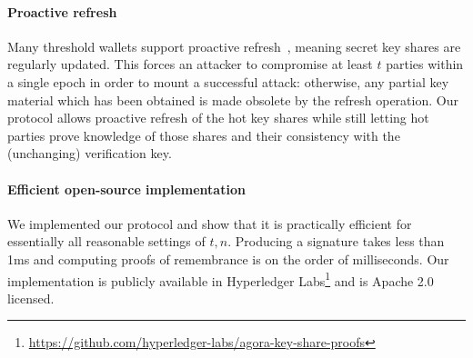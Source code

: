 \paragraph{Proactive refresh}
Many threshold wallets support proactive refresh~\cite{SP:KMOS21}, meaning secret key shares are regularly updated. This forces an attacker to compromise at least $t$ parties within a single epoch in order to mount a successful attack: otherwise, any partial key material which has been obtained is made obsolete by the refresh operation. Our protocol allows proactive refresh of the hot key shares while still letting hot parties prove knowledge of those shares and their consistency with the (unchanging) verification key.

\paragraph{Efficient open-source implementation}
We implemented our protocol and show that it is practically efficient for essentially all reasonable settings of $t, n$. Producing a signature takes less than 1ms and computing proofs of remembrance is on the order of milliseconds. Our implementation is publicly available in Hyperledger Labs\footnote{\url{https://github.com/hyperledger-labs/agora-key-share-proofs}} and is Apache 2.0 licensed. 